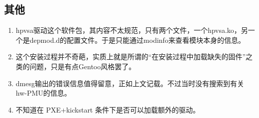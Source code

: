 \documentclass[a4paper,12pt]{article}
\begin{document}
\begin{CJK}{UTF8}{gbsn}
\section{其他}
\begin{enumerate}
	\item hpvsa驱动这个软件包，其内容不太规范，只有两个文件，一个hpvsa.ko，另一个是depmod.d的配置文件。于是只能通过modinfo来查看模块本身的信息。
	\item 这个安装过程并不奇葩，实质上就是所谓的“在安装过程中加载缺失的固件”之类的问题，只是有点Gentoo风格罢了。
	\item dmesg输出的错误信息值得留意，正如上文记载。不过当时没有搜索到有关hw-PMU的信息。
	\item 不知道在 PXE+kickstart 条件下是否可以加载额外的驱动。
\end{enumerate}

\end{CJK}
\end{document}
